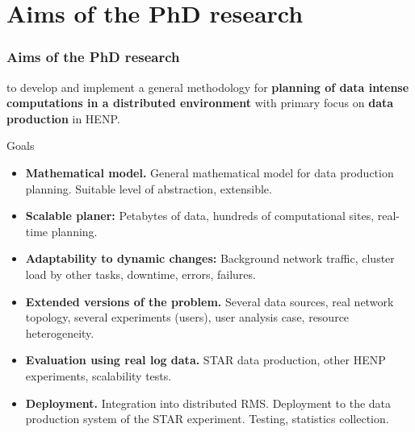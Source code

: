 \documentclass{beamer}
\begin{document}
\section{Aims of the PhD research}
\begin{frame}\frametitle{Aims of the PhD research}
\begin{footnotesize}
to develop and implement a general methodology for \textbf{planning of data intense computations in a distributed environment} with primary focus on \textbf{data production} in HENP. 
\begin{block}{Goals}
\begin{itemize}
\item \textbf{Mathematical model.} General mathematical model for data production planning. Suitable level of abstraction, extensible. 
\item \textbf{Scalable planer:} Petabytes of data, hundreds of computational sites, real-time planning.
\item \textbf{Adaptability to dynamic changes:} Background network traffic, cluster load by other tasks, downtime, errors, failures.
\item \textbf{Extended versions of the problem.} Several data sources, real network topology, several experiments (users), user analysis case, resource heterogeneity. 
\item \textbf{Evaluation using real log data.} STAR data production, other HENP experiments, scalability tests. 
\item \textbf{Deployment.} Integration into distributed RMS. Deployment to the data production system of the STAR experiment. Testing, statistics collection. 
\end{itemize}

\end{block}
\end{footnotesize}
\end{frame}
\end{document}
